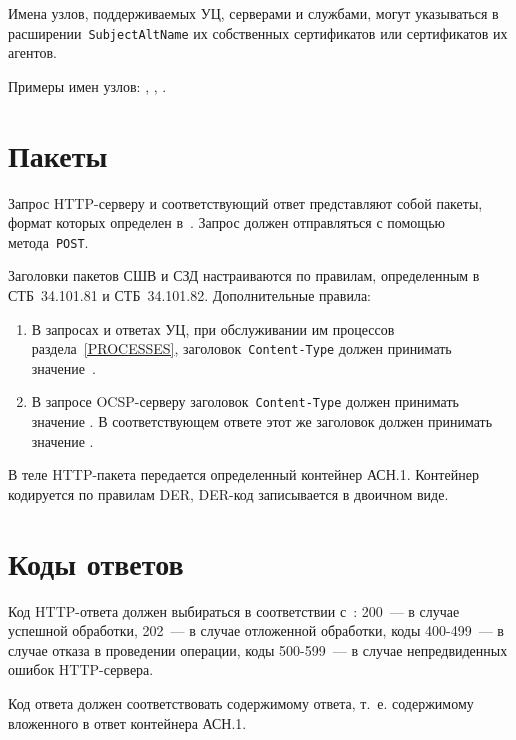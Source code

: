 Имена узлов, поддерживаемых УЦ, серверами и службами, могут указываться в 
расширении~\texttt{SubjectAltName} их собственных сертификатов или 
сертификатов их агентов. 

Примеры имен узлов: , 
, 
.

\section{Пакеты}\label{TRANSPORT.Packets}

Запрос HTTP-серверу и соответствующий ответ представляют собой пакеты,
формат которых определен в~\cite{HTTP}.
%
Запрос должен отправляться с помощью метода~\texttt{POST}.

Заголовки пакетов СШВ и СЗД настраиваются по правилам, 
определенным в СТБ~34.101.81 и СТБ~34.101.82. 
%
Дополнительные правила:
\begin{enumerate}
\item
В запросах и ответах УЦ, при обслуживании им процессов раздела~\ref{PROCESSES},
заголовок~\texttt{Content-Type} должен принимать значение~.

\item
В запросе OCSP-серверу заголовок~\texttt{Content-Type} 
должен принимать значение .
В соответствующем ответе этот же заголовок должен принимать значение 
. 
\end{enumerate}

В теле HTTP-пакета передается определенный контейнер АСН.1.
Контейнер кодируется по правилам DER, DER-код записывается
в двоичном виде.

\section{Коды ответов}\label{TRANSPORT.Codes}

Код HTTP-ответа должен выбираться в соответствии с~\cite{HTTP}: 
200~--- в случае успешной обработки, 
202~--- в случае отложенной обработки,
коды 400-499~--- в случае отказа в проведении операции,
коды 500-599~--- в случае непредвиденных ошибок HTTP-сервера.

Код ответа должен соответствовать содержимому ответа, т.~е.
содержимому вложенного в ответ контейнера АСН.1.

\section{}\label{TRANSPORT.Nonce}

